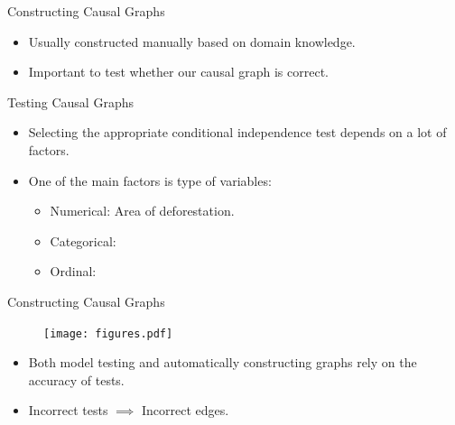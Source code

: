 \documentclass[aspectratio=169]{beamer}
\begin{document}
\begin{frame}{Constructing Causal Graphs}
	
	\vspace{2em}
	
	\begin{itemize}
		\item Usually constructed manually based on domain knowledge.
		\item Important to test whether our causal graph is correct.
	\end{itemize}
	
	\vspace{1em}
\end{frame}

\begin{frame}{Testing Causal Graphs}
	\begin{itemize}
		\item Selecting the appropriate conditional independence test depends on a
	lot of factors.
		\item One of the main factors is type of variables:
			\begin{itemize}
				\item Numerical: Area of deforestation.
				\item Categorical: 
				\item Ordinal:
			\end{itemize}
	\end{itemize}

	\vspace{2em}
		
\end{frame}

\begin{frame}{Constructing Causal Graphs}
	\begin{figure}
		\center
		\texttt{[image: figures.pdf]}
	\end{figure}

	\begin{itemize}
		\item Both model testing and automatically constructing graphs rely on the accuracy of tests.
		\item Incorrect tests $ \implies $ Incorrect edges.
	\end{itemize}

	\vspace{0.5em}
	
\end{frame}
\end{document}
